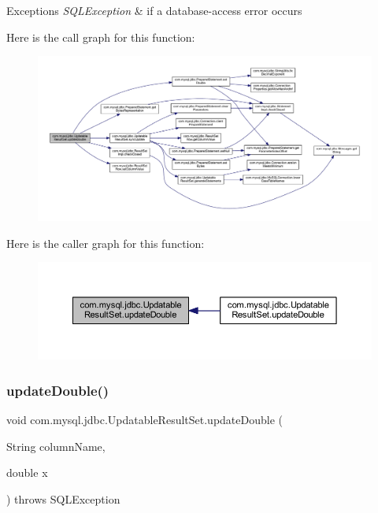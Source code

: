\begin{DoxyExceptions}{Exceptions}
{\em S\+Q\+L\+Exception} & if a database-\/access error occurs \\
\hline
\end{DoxyExceptions}
Here is the call graph for this function\+:
\nopagebreak
\begin{figure}[H]
\begin{center}
\leavevmode
\includegraphics[width=350pt]{classcom_1_1mysql_1_1jdbc_1_1_updatable_result_set_acaefa9679a9a4f8b588c76c960756f87_cgraph}
\end{center}
\end{figure}
Here is the caller graph for this function\+:
\nopagebreak
\begin{figure}[H]
\begin{center}
\leavevmode
\includegraphics[width=350pt]{classcom_1_1mysql_1_1jdbc_1_1_updatable_result_set_acaefa9679a9a4f8b588c76c960756f87_icgraph}
\end{center}
\end{figure}
\mbox{\label{classcom_1_1mysql_1_1jdbc_1_1_updatable_result_set_a0f22f27383615d4803d4355a612970aa}} 
\subsubsection{\texorpdfstring{update\+Double()}{updateDouble()}\hspace{0.1cm}{\footnotesize\ttfamily [2/2]}}
{\footnotesize\ttfamily void com.\+mysql.\+jdbc.\+Updatable\+Result\+Set.\+update\+Double (\begin{DoxyParamCaption}\item[{String}]{column\+Name,  }\item[{double}]{x }\end{DoxyParamCaption}) throws S\+Q\+L\+Exception}


